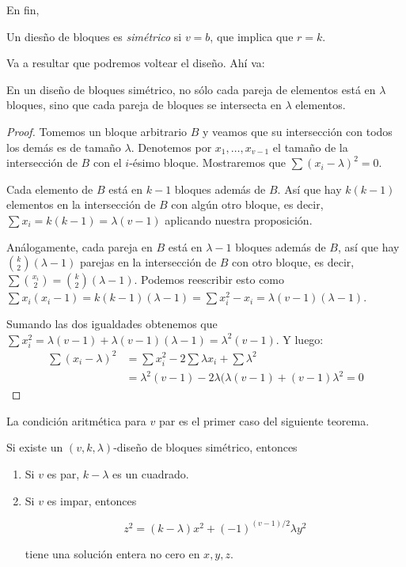 En fin,
\begin{definition}
\label{definition-combi-026}
Un diesño de bloques es \emph{simétrico} si
$v = b$, que implica que $r = k$.
\end{definition}
Va a resultar que podremos voltear el diseño.
Ahí va:
\begin{proposition}
\label{proposition-combi-004}
En un diseño de bloques simétrico, no sólo
cada pareja de elementos está en $\lambda$
bloques, sino que cada pareja de bloques se
intersecta en $\lambda$ elementos.
\end{proposition}
\begin{proof}
Tomemos un bloque arbitrario $B$ y veamos que
su intersección con todos los demás es de
tamaño $\lambda$. Denotemos por $x_1,
\ldots,x_{v-1}$ el tamaño de la intersección
de $B$ con el $i$-ésimo bloque. Mostraremos
que $ \sum(x_i-\lambda)^2 = 0$.

Cada elemento de $B$ está en $k-1$ bloques
además de $B$. Así que hay $k(k-1)$ elementos
en la intersección de $B$ con algún otro
bloque, es decir, $ \sum x_i = k(k-1) =
\lambda(v-1)$ aplicando nuestra proposición.

Análogamente, cada pareja en $B$ está en
$\lambda -1$ bloques además de $B$, así que
hay ${k \choose 2}(\lambda-1)$ parejas en la
intersección de $B$ con otro bloque, es
decir, $ \sum{x_i \choose 2} = {k \choose
2}(\lambda-1)$. Podemos reescribir esto como
$ \sum x_i(x_i-1) = k(k-1)(\lambda-1) =  \sum
x_i^2-x_i = \lambda(v-1)(\lambda-1)$.

Sumando las dos igualdades obtenemos que $
\sum x_i^2 = \lambda(v-1) +
\lambda(v-1)(\lambda-1) = \lambda^2(v-1)$. Y
luego:
$$
\begin{aligned}
 \sum(x_i-\lambda)^2& =  \sum x_i^2-2
\sum\lambda x_i +  \sum \lambda^2\\
& = \lambda^2(v-1)-2\lambda(\lambda(v-1) +
(v-1)\lambda^2 = 0
\end{aligned}
$$
\end{proof}
\begin{remark}
\label{proposition-combi-005}
La condición aritmética para $v$ par es el
primer caso del siguiente teorema.
\end{remark}
\begin{theorem}
\label{theorem-combi-023}
Si existe un $(v,k,\lambda)$-diseño de
bloques simétrico, entonces
\begin{enumerate}
\item[\textit{(a)}] Si $v$ es par,
$k-\lambda$ es un cuadrado.
\item[\textit{(b)}] Si $v$ es impar, entonces

$$
z^2=(k-\lambda)x^2+(-1)^{(v-1)/2}\lambda y^2
$$

tiene una solución entera no cero en $x,y,z$.
\end{enumerate}
\end{theorem}
